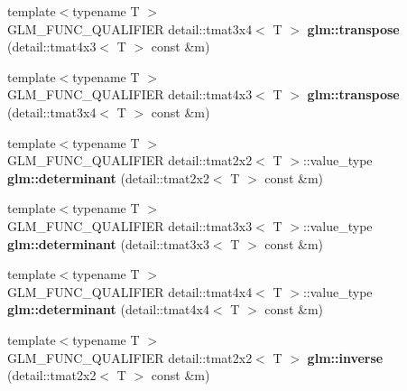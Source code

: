 \begin{DoxyCompactItemize}
\item 
\hypertarget{namespaceglm_ab3249f9f058bed8dfae6bf98f388ba7e}{}{\footnotesize template$<$typename T $>$ }\\G\+L\+M\+\_\+\+F\+U\+N\+C\+\_\+\+Q\+U\+A\+L\+I\+F\+I\+E\+R detail\+::tmat3x4$<$ T $>$ {\bfseries glm\+::transpose} (detail\+::tmat4x3$<$ T $>$ const \&m)\label{namespaceglm_ab3249f9f058bed8dfae6bf98f388ba7e}

\item 
\hypertarget{namespaceglm_ada628757003c8d123a0c92140d7abe71}{}{\footnotesize template$<$typename T $>$ }\\G\+L\+M\+\_\+\+F\+U\+N\+C\+\_\+\+Q\+U\+A\+L\+I\+F\+I\+E\+R detail\+::tmat4x3$<$ T $>$ {\bfseries glm\+::transpose} (detail\+::tmat3x4$<$ T $>$ const \&m)\label{namespaceglm_ada628757003c8d123a0c92140d7abe71}

\item 
\hypertarget{namespaceglm_af46227c76d96e80fee1fd796c8bcd381}{}{\footnotesize template$<$typename T $>$ }\\G\+L\+M\+\_\+\+F\+U\+N\+C\+\_\+\+Q\+U\+A\+L\+I\+F\+I\+E\+R detail\+::tmat2x2$<$ T $>$\+::value\+\_\+type {\bfseries glm\+::determinant} (detail\+::tmat2x2$<$ T $>$ const \&m)\label{namespaceglm_af46227c76d96e80fee1fd796c8bcd381}

\item 
\hypertarget{namespaceglm_a82f21c90b1e7ac79de26ae25db61b841}{}{\footnotesize template$<$typename T $>$ }\\G\+L\+M\+\_\+\+F\+U\+N\+C\+\_\+\+Q\+U\+A\+L\+I\+F\+I\+E\+R detail\+::tmat3x3$<$ T $>$\+::value\+\_\+type {\bfseries glm\+::determinant} (detail\+::tmat3x3$<$ T $>$ const \&m)\label{namespaceglm_a82f21c90b1e7ac79de26ae25db61b841}

\item 
\hypertarget{namespaceglm_a8d6ce863c226bb3e6f7c607a82fcbb35}{}{\footnotesize template$<$typename T $>$ }\\G\+L\+M\+\_\+\+F\+U\+N\+C\+\_\+\+Q\+U\+A\+L\+I\+F\+I\+E\+R detail\+::tmat4x4$<$ T $>$\+::value\+\_\+type {\bfseries glm\+::determinant} (detail\+::tmat4x4$<$ T $>$ const \&m)\label{namespaceglm_a8d6ce863c226bb3e6f7c607a82fcbb35}

\item 
\hypertarget{namespaceglm_a0bdb22ae9f1447b6bfd92c704b638973}{}{\footnotesize template$<$typename T $>$ }\\G\+L\+M\+\_\+\+F\+U\+N\+C\+\_\+\+Q\+U\+A\+L\+I\+F\+I\+E\+R detail\+::tmat2x2$<$ T $>$ {\bfseries glm\+::inverse} (detail\+::tmat2x2$<$ T $>$ const \&m)\label{namespaceglm_a0bdb22ae9f1447b6bfd92c704b638973}


\end{DoxyCompactItemize}
